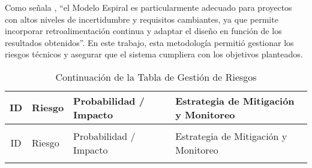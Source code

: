 Como señala \citeauthor{boehm_spiral_1988} \citeyear{boehm_spiral_1988}, ``el Modelo Espiral es particularmente adecuado para proyectos con altos niveles de incertidumbre y requisitos cambiantes, ya que permite incorporar retroalimentación continua y adaptar el diseño en función de los resultados obtenidos”. En este trabajo, esta metodología permitió gestionar los riesgos técnicos y asegurar que el sistema cumpliera con los objetivos planteados.

  {\small
    \begin{longtable}[c]{c p{5.8cm} >{\centering\arraybackslash}p{2cm} p{5.8cm}}
      \toprule
      ID   & \centering Riesgo                                                                                                                                                                                                                                                 & Probabilidad / Impacto & Estrategia de Mitigación y Monitoreo                                                                                                                                                                                                                                                                                                                                                                                                                       \\
      \midrule
      \endfirsthead
      \caption{Continuación de la Tabla de Gestión de Riesgos}                                                                                                                                                                                                                                                                                                                                                                                                                                                                                                                                                                                                                                                                                                       \\
      \toprule
      ID   & \centering Riesgo                                                                                                                                                                                                                                                 & Probabilidad / Impacto & Estrategia de Mitigación y Monitoreo                                                                                                                                                                                                                                                                                                                                                                                                                       \\
      \midrule
      \endhead
      \endfoot
      \endlastfoot


\end{longtable}}
